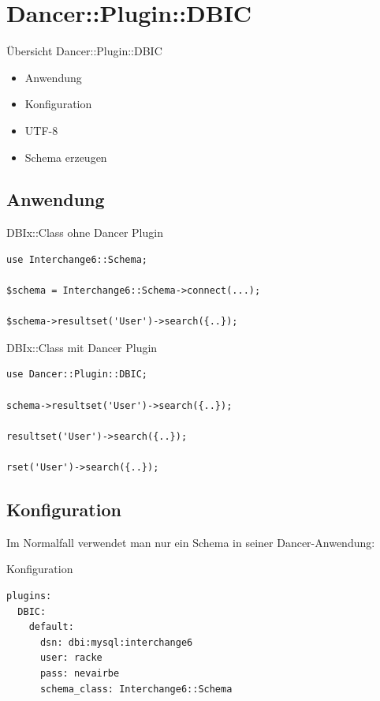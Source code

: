 \section{Dancer::Plugin::DBIC}

\begin{frame}{Übersicht Dancer::Plugin::DBIC}
\begin{itemize}
\item Anwendung
\item Konfiguration
\item UTF-8
\item Schema erzeugen
\end{itemize}
\end{frame}

\subsection{Anwendung}
\begin{frame}[fragile]{DBIx::Class ohne Dancer Plugin}
\begin{lstlisting}
use Interchange6::Schema;

$schema = Interchange6::Schema->connect(...);

$schema->resultset('User')->search({..});
\end{lstlisting}
\end{frame}

\begin{frame}[fragile]{DBIx::Class mit Dancer Plugin}
\begin{lstlisting}
use Dancer::Plugin::DBIC;

schema->resultset('User')->search({..});

resultset('User')->search({..});

rset('User')->search({..});
\end{lstlisting}
\end{frame}

\subsection{Konfiguration}

Im Normalfall verwendet man nur ein Schema in seiner
Dancer-Anwendung:

\begin{frame}[fragile]{Konfiguration}
\begin{lstlisting}
plugins:
  DBIC:
    default:
      dsn: dbi:mysql:interchange6
      user: racke
      pass: nevairbe
      schema_class: Interchange6::Schema
\end{lstlisting}
\end{frame}

